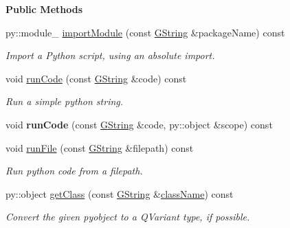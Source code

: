 \begin{Indent}\textbf{ Public Methods}\par
\begin{DoxyCompactItemize}
\item 
py\+::module\+\_\+ \mbox{\hyperlink{classrev_1_1_python_a_p_i_a96781b2064238a48cd2e80da8a55cd36}{import\+Module}} (const \mbox{\hyperlink{classrev_1_1_g_string}{G\+String}} \&package\+Name) const
\begin{DoxyCompactList}\small\item\em Import a Python script, using an absolute import. \end{DoxyCompactList}\item 
\mbox{\label{classrev_1_1_python_a_p_i_a03f053f8bca2a05169bf33da15b3e3c1}} 
void \mbox{\hyperlink{classrev_1_1_python_a_p_i_a03f053f8bca2a05169bf33da15b3e3c1}{run\+Code}} (const \mbox{\hyperlink{classrev_1_1_g_string}{G\+String}} \&code) const
\begin{DoxyCompactList}\small\item\em Run a simple python string. \end{DoxyCompactList}\item 
\mbox{\label{classrev_1_1_python_a_p_i_ad3e4654c312adb2e1fb9412cfaf7e124}} 
void {\bfseries run\+Code} (const \mbox{\hyperlink{classrev_1_1_g_string}{G\+String}} \&code, py\+::object \&scope) const
\item 
\mbox{\label{classrev_1_1_python_a_p_i_a3e8b5ffca057c12a26b356e55f9aa831}} 
void \mbox{\hyperlink{classrev_1_1_python_a_p_i_a3e8b5ffca057c12a26b356e55f9aa831}{run\+File}} (const \mbox{\hyperlink{classrev_1_1_g_string}{G\+String}} \&filepath) const
\begin{DoxyCompactList}\small\item\em Run python code from a filepath. \end{DoxyCompactList}\item 
py\+::object \mbox{\hyperlink{classrev_1_1_python_a_p_i_a5bf04b237b6638b2b8f64c2043efb287}{get\+Class}} (const \mbox{\hyperlink{classrev_1_1_g_string}{G\+String}} \&\mbox{\hyperlink{classrev_1_1_python_a_p_i_ab8d7ecd519d9d930bc7024a9e222218e}{class\+Name}}) const
\begin{DoxyCompactList}\small\item\em Convert the given pyobject to a Q\+Variant type, if possible. \end{DoxyCompactList}\item 

\end{DoxyCompactItemize}
\end{Indent}
